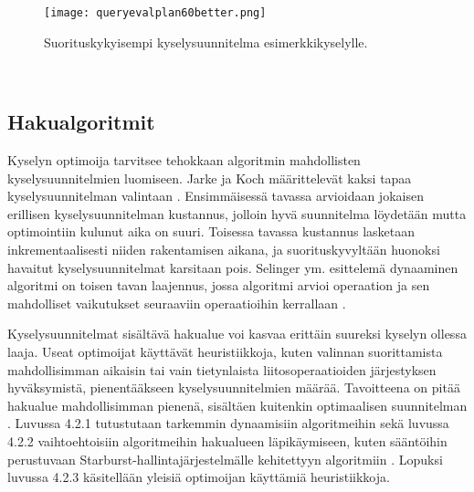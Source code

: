\documentclass[finnish]{tktltiki2}
\theoremstyle{definition}
\theoremstyle{remark}
\begin{document}
 \begin{figure}[!h] 
  \centering
    \texttt{[image: queryevalplan60better.png]}
  \caption{Suorituskykyisempi kyselysuunnitelma esimerkkikyselylle.}
\end{figure}
\\\newline
%
\subsection{Hakualgoritmit}
Kyselyn optimoija tarvitsee tehokkaan algoritmin mahdollisten kyselysuunnitelmien luomiseen. Jarke ja Koch määrittelevät kaksi tapaa kyselysuunnitelman valintaan \cite{jarke1984}. Ensimmäisessä tavassa arvioidaan jokaisen erillisen kyselysuunnitelman kustannus, jolloin hyvä suunnitelma löydetään mutta optimointiin kulunut aika on suuri. Toisessa tavassa kustannus lasketaan inkrementaalisesti niiden rakentamisen aikana, ja suorituskyvyltään huonoksi havaitut kyselysuunnitelmat karsitaan pois. Selinger ym. esittelemä dynaaminen algoritmi on toisen tavan laajennus, jossa algoritmi arvioi operaation ja sen mahdolliset vaikutukset seuraaviin operaatioihin kerrallaan \cite{selinger1979access}. 

Kyselysuunnitelmat sisältävä hakualue voi kasvaa erittäin suureksi kyselyn ollessa laaja. Useat optimoijat käyttävät heuristiikkoja, kuten valinnan suorittamista mahdollisimman aikaisin tai vain tietynlaista liitosoperaatioiden järjestyksen hyväksymistä, pienentääkseen kyselysuunnitelmien määrää. Tavoitteena on pitää hakualue mahdollisimman pienenä, sisältäen kuitenkin optimaalisen suunnitelman \cite{jarke1984}. Luvussa 4.2.1 tutustutaan tarkemmin dynaamisiin algoritmeihin sekä luvussa 4.2.2 vaihtoehtoisiin algoritmeihin hakualueen läpikäymiseen, kuten sääntöihin perustuvaan Starburst-hallintajärjestelmälle kehitettyyn algoritmiin \cite{lohman1988grammar}. Lopuksi luvussa 4.2.3 käsitellään yleisiä optimoijan käyttämiä heuristiikkoja.

\end{document}
